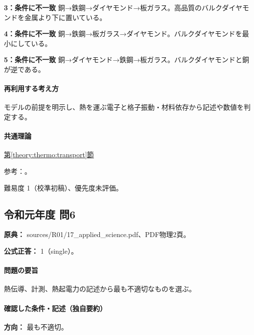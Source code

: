 \noindent\textbf{3：条件に不一致} 銅→鉄鋼→ダイヤモンド→板ガラス。高品質のバルクダイヤモンドを金属より下に置いている。\par

\noindent\textbf{4：条件に不一致} 銅→鉄鋼→板ガラス→ダイヤモンド。バルクダイヤモンドを最小にしている。\par

\noindent\textbf{5：条件に不一致} 銅→ダイヤモンド→鉄鋼→板ガラス。バルクダイヤモンドと銅が逆である。\par

\paragraph{再利用する考え方} モデルの前提を明示し、熱を運ぶ電子と格子振動・材料依存から記述や数値を判定する。

\paragraph{共通理論} \hyperref[theory:thermo:transport]{第\ref*{theory:thermo:transport}節}

\par 参考：\cite{aist_metal_thermal,wang_sun_diamond2024,agc_glass_thermal}。

\par 難易度 1（校準初稿）、優先度未評価。

\subsection{令和元年度 問6}
\label{q:r01-reg-applied-06}

\noindent\textbf{原典：} sources/R01/17\_applied\_science.pdf、PDF物理2頁。

\textbf{公式正答：} 1（single）。

\paragraph{問題の要旨} 熱伝導、計測、熱起電力の記述から最も不適切なものを選ぶ。

\paragraph{確認した条件・記述（独自要約）}\mbox{}\par

\noindent\textbf{方向：} 最も不適切。\par

